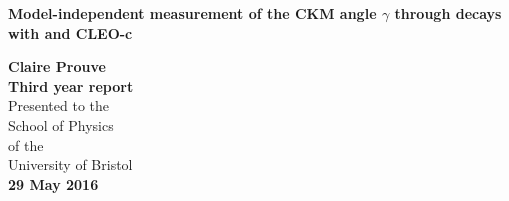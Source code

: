 \titlehead{%
} %
\titlefoot{%
}

\newsavebox{\Prof}

\begin{titlepage}
\begin{center}
\hbox{} %
\vspace*{2.5cm}
{\Huge\bfseries Model-independent measurement of the CKM angle $\gamma $ through \BToDK decays with \lhcb and CLEO-c \par}
\vskip 1.5cm
\large{ \textbf{Claire Prouve}}\normalsize\\
\vspace{2.cm}
\large{\textbf{Third year report}}\normalsize\\
\vspace*{1.5cm}
Presented to the \\
School of Physics\\
of the \\
University of Bristol\\

 \textbf{29 May 2016}\\%
\vspace*{0.5cm}
\end{center}
\vspace*{1.3cm}
\end{titlepage}
